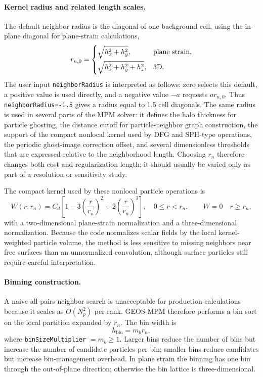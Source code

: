 \paragraph{Kernel radius and related length scales.}
The default neighbor radius is the diagonal of one background cell, using the in-plane diagonal for plane-strain calculations,
\begin{equation}
  r_{n,0}=\begin{cases}
    \sqrt{h_x^2+h_y^2}, & \hbox{plane strain},\\[2mm]
    \sqrt{h_x^2+h_y^2+h_z^2}, & \hbox{3D}.
  \end{cases}
\end{equation}
The user input \texttt{neighborRadius} is interpreted as follows: zero selects this default, a positive value is used directly, and a negative value $-a$ requests $a r_{n,0}$.  Thus \texttt{neighborRadius=-1.5} gives a radius equal to 1.5 cell diagonals.  The same radius is used in several parts of the MPM solver: it defines the halo thickness for particle ghosting, the distance cutoff for particle-neighbor graph construction, the support of the compact nonlocal kernel used by DFG and SPH-type operations, the periodic ghost-image correction offset, and several dimensionless thresholds that are expressed relative to the neighborhood length.  Choosing $r_n$ therefore changes both cost and regularization length; it should usually be varied only as part of a resolution or sensitivity study.

The compact kernel used by these nonlocal particle operations is
\begin{equation}
  W(r;r_n)=C_d\left[1-3\left(\frac{r}{r_n}\right)^2+2\left(\frac{r}{r_n}\right)^3\right],\quad 0\le r<r_n,
  \qquad W=0\quad r\ge r_n,
\end{equation}
with a two-dimensional plane-strain normalization and a three-dimensional normalization.  Because the code normalizes scalar fields by the local kernel-weighted particle volume, the method is less sensitive to missing neighbors near free surfaces than an unnormalized convolution, although surface particles still require careful interpretation.

\paragraph{Binning construction.}
A naive all-pairs neighbor search is unacceptable for production calculations because it scales as $O(N_p^2)$ per rank.  GEOS-MPM therefore performs a bin sort on the local partition expanded by $r_n$.  The bin width is
\begin{equation}
  h_{\mathrm{bin}}=m_b r_n,
\end{equation}
where \texttt{binSizeMultiplier} $=m_b\ge 1$.  Larger bins reduce the number of bins but increase the number of candidate particles per bin; smaller bins reduce candidates but increase bin-management overhead.  In plane strain the binning has one bin through the out-of-plane direction; otherwise the bin lattice is three-dimensional.

